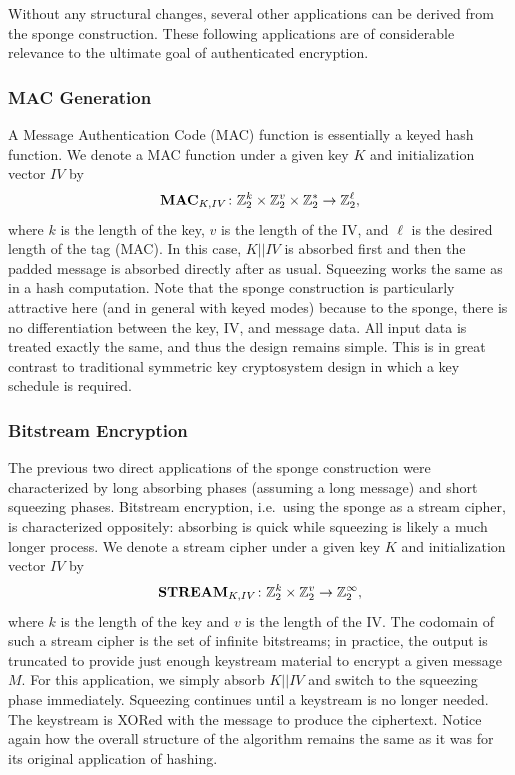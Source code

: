 Without any structural changes, several other applications can be derived from the sponge construction.
These following applications are of considerable relevance to the ultimate goal of authenticated encryption.

\subsubsection{MAC Generation}
A Message Authentication Code (MAC) function is essentially a keyed hash function.
We denote a MAC function under a given key $K$ and initialization vector $IV$ by
\begin{equation*}
\mathbf{MAC}_{K,IV} \colon \mathbb{Z}_2^k \times \mathbb{Z}_2^v \times \mathbb{Z}_2^* \rightarrow \mathbb{Z}_2^{\ell},
\end{equation*}
where $k$ is the length of the key, $v$ is the length of the IV, and $\ell$ is the desired length of the tag (MAC).
In this case, $K||IV$ is absorbed first and then the padded message is absorbed directly after as usual.
Squeezing works the same as in a hash computation.
Note that the sponge construction is particularly attractive here (and in general with keyed modes) because to the sponge, there is no differentiation between the key, IV, and message data.
All input data is treated exactly the same, and thus the design remains simple.
This is in great contrast to traditional symmetric key cryptosystem design in which a key schedule is required.

\subsubsection{Bitstream Encryption}
The previous two direct applications of the sponge construction were characterized by long absorbing phases (assuming a long message) and short squeezing phases.
Bitstream encryption, i.e.\ using the sponge as a stream cipher, is characterized oppositely: absorbing is quick while squeezing is likely a much longer process.
We denote a stream cipher under a given key $K$ and initialization vector $IV$ by
\begin{equation*}
\mathbf{STREAM}_{K,IV} \colon \mathbb{Z}_2^k \times \mathbb{Z}_2^v \rightarrow \mathbb{Z}_2^{\infty},
\end{equation*}
where $k$ is the length of the key and $v$ is the length of the IV.
The codomain of such a stream cipher is the set of infinite bitstreams; in practice, the output is truncated to provide just enough keystream material to encrypt a given message $M$.
For this application, we simply absorb $K||IV$ and switch to the squeezing phase immediately.
Squeezing continues until a keystream is no longer needed.
The keystream is XORed with the message to produce the ciphertext.
Notice again how the overall structure of the algorithm remains the same as it was for its original application of hashing.

